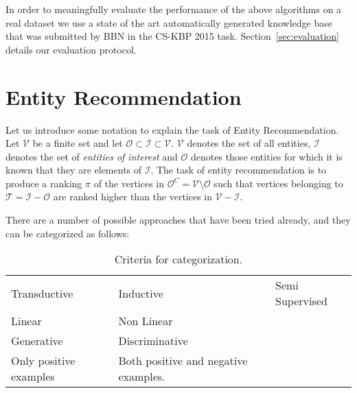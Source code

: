 \documentclass[paper=a4,fontsize=11pt]{scrartcl}
\newcommand{\Secref}[1]{Section~\ref{#1}}
\numberwithin{equation}{section}    %
\numberwithin{figure}{section}      %
\numberwithin{table}{section}       %
\newcommand{\task}{CS-KBP 2015 task}
\begin{document}
In order to meaningfully evaluate the performance of the above algorithms on a real dataset
we use a state of the art automatically generated knowledge base that was submitted by BBN in
the \task. \Secref{sec:evaluation} details our evaluation protocol.

\section{Entity Recommendation}
\label{sec:entity-recommendation}
Let us introduce some notation to explain the task of Entity Recommendation.
Let $\mathcal{V}$ be a finite set and let
$\mathcal{O} \subset \mathcal{I} \subset \mathcal{V}$.
$\mathcal{V}$ denotes the set of all entities, $\mathcal{I}$ denotes the set
of \textit{entities of interest} and $\mathcal{O}$ denotes those entities for
which it is known that they are elements of $\mathcal{I}$. The task of entity
recommendation is to produce a ranking $\pi$ of the vertices in
$\mathcal{O}^C = \mathcal{V} \setminus \mathcal{O}$
such that vertices belonging to $\mathcal{T} = \mathcal{I} - \mathcal{O}$ are
ranked higher than the vertices in $\mathcal{V} - \mathcal{I}$.

There are a number of possible approaches that have been tried already, and they can be categorized
as follows:

\begin{table}[htbp]
  \centering
  \begin{tabular}{l l l}
    Transductive & Inductive & Semi Supervised \\
    Linear & Non Linear \\
    Generative & Discriminative \\
    Only positive examples & Both positive and negative examples.
  \end{tabular}
  \caption{Criteria for categorization.}
  \label{tab:cat-crit}
\end{table}
\end{document}
